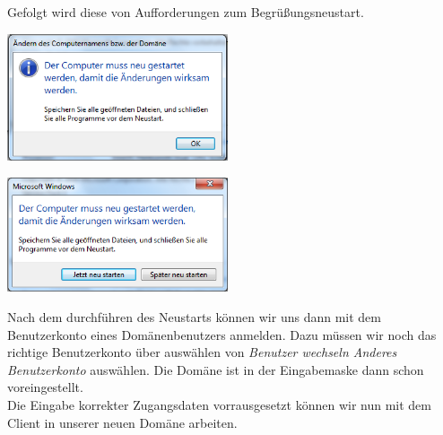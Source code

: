 \documentclass[12pt,a4paper,titlepage]{scrartcl} %
\begin{document}
Gefolgt wird diese von Aufforderungen zum Begrüßungsneustart.\\

	\begin{center}\includegraphics[width=6.5cm]{Bilder/Client/Client06}\\ \end{center}
	
	\begin{center}\includegraphics[width=6.5cm]{Bilder/Client/Client07}\\ \end{center}

Nach dem durchführen des Neustarts können wir uns dann mit dem Benutzerkonto eines Domänenbenutzers anmelden. Dazu müssen wir noch das richtige Benutzerkonto über auswählen von \emph{Benutzer wechseln  Anderes Benutzerkonto} auswählen. Die Domäne ist in der Eingabemaske dann schon voreingestellt.\\
Die Eingabe korrekter Zugangsdaten vorrausgesetzt können wir nun mit dem Client in unserer neuen Domäne arbeiten.
\end{document}
